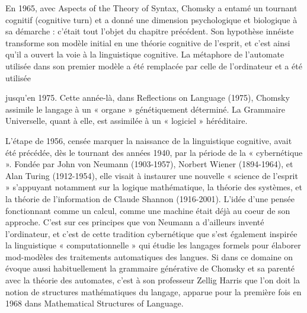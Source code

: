  En 1965, avec Aspects of the Theory of Syntax, Chomsky a entamé un tournant cognitif (cognitive turn) et a donné une dimension psychologique et biologique à sa démarche : c’était tout l’objet du chapitre précédent. Son hypothèse innéiste transforme son modèle initial en une théorie cognitive de l'esprit, et c’est ainsi qu’il a ouvert la voie à la linguistique cognitive. La métaphore de l’automate utilisée dans son premier modèle a été remplacée par celle de l’ordinateur et a été utilisée\par


jusqu’en 1975. Cette année-là, dans Reflections on Language (1975), Chomsky assimile le langage à un « organe » génétiquement déterminé. La Grammaire Universelle, quant à elle, est assimilée à un « logiciel » héréditaire.\par

 L'étape de 1956, censée marquer la naissance de la linguistique cognitive, avait été précédée, dès le tournant des années 1940, par la période de la « cybernétique ». Fondée par John von Neumann (1903-1957), Norbert Wiener (1894-1964), et Alan Turing (1912-1954), elle visait à instaurer une nouvelle « science de l’esprit » s’appuyant notamment sur la logique mathématique, la théorie des systèmes, et la théorie de l’information de Claude Shannon (1916-2001). L’idée d’une pensée fonctionnant comme un calcul, comme une machine était déjà au coeur de son approche. C’est sur ces principes que von Neumann a d’ailleurs inventé l'ordinateur, et c’est de cette tradition cybernétique que s’est également inspirée la linguistique « computationnelle » qui étudie les langages formels pour élaborer mod-modèles des traitements automatiques des langues. Si dans ce domaine on évoque aussi habituellement la grammaire générative de Chomsky et sa parenté avec la théorie des automates, c’est à son professeur Zellig Harris que l’on doit la notion de structures mathématiques du langage, apparue pour la première fois en 1968 dans Mathematical Structures of Language.\par

